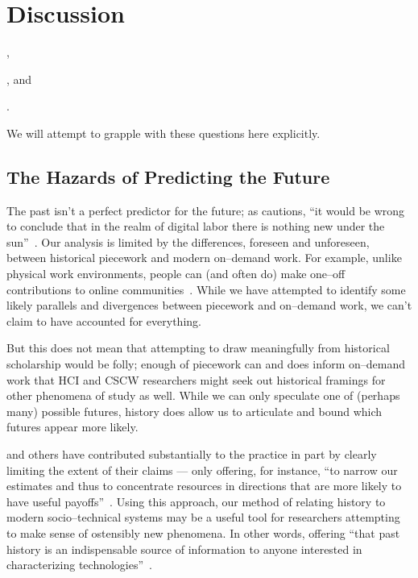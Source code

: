 \documentclass[pn4226]{subfiles}
\begin{document}
\section{Discussion}
\begin{inlinelist}
  \item {},
  \item {}, and
  \item {}.
\end{inlinelist}
We will attempt to grapple with these questions here explicitly.


\subsection{The Hazards of Predicting the Future}\label{sec:perilousProblemsPredicting}
The past isn't a perfect predictor for the future;
as \citeauthor{scholz2012digital} cautions,
``it would be wrong to conclude that in the realm of digital labor there is nothing new under the sun''~\cite{scholz2012digital}.
Our analysis is limited by the differences, foreseen and unforeseen, between historical piecework and modern on--demand work.
For example, unlike physical work environments, people can (and often do) make one--off contributions to online communities~\cite{mcinnis2016one}.
While we have attempted to identify some likely parallels and divergences between piecework and on--demand work,
we can't claim to have accounted for everything.

But this does not mean that attempting to draw meaningfully from historical scholarship would be folly;
enough of piecework can and does inform on--demand work that
HCI and CSCW researchers might seek out historical framings for other phenomena of study as well.
While we can only speculate one of (perhaps many) possible futures, history does allow us to articulate and bound which futures appear more likely.

\citeauthor{rosenberg1994exploring} and others have contributed substantially to the practice in part by clearly limiting the extent of their claims
--- only offering, for instance,
``to narrow our estimates and thus to concentrate resources in directions that are more likely to have useful payoffs''~\cite{rosenberg1994exploring}.
Using this approach,
our method of relating history to modern socio--technical systems may be
a useful tool for researchers attempting
to make sense of ostensibly new phenomena.
In other words, offering ``that past history is an indispensable source of information
to anyone interested in characterizing technologies''~\cite{rosenberg1982inside}.
\end{document}
